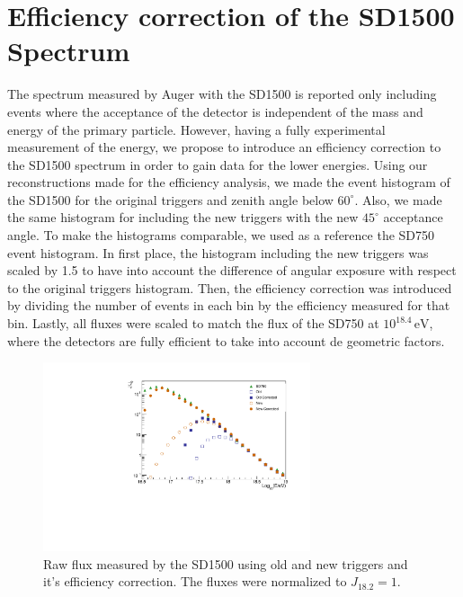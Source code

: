 \documentclass[12pt,a4paper]{article}
\newcommand{\eV}{\, \mathrm{eV}}
\begin{document}
\section{Efficiency correction of the SD1500 Spectrum}
\label{sec:spectrum}

The spectrum measured by Auger with the SD1500 is reported only including events where the acceptance of the detector is independent of the mass and energy of the primary particle. However, having a fully experimental measurement of the energy, we propose to introduce an efficiency correction to the SD1500 spectrum in order to gain data for the lower energies.
Using our reconstructions made for the efficiency analysis, we made the event histogram of the SD1500 for the original triggers and zenith angle below $60^{\circ}$. Also, we made the same histogram for including the new triggers with the new $45^{\circ}$ acceptance angle. To make the histograms comparable, we used as a reference the SD750 event histogram. In first place, the histogram including the new triggers was scaled by 1.5 to have into account the difference of angular exposure with respect to the original triggers histogram. Then, the efficiency correction was introduced by dividing the number of events in each bin by the efficiency measured for that bin. Lastly, all fluxes were scaled to match the flux of the SD750 at $10^{18.4}\eV$, where the detectors are fully efficient to take into account de geometric factors. 

\begin{figure}[h]
    \begin{center}
        \includegraphics[width=0.7\textwidth]{plots/spectrum.pdf}
        \caption{Raw flux measured by the SD1500 using old and new triggers and it's efficiency correction. The fluxes were normalized to $J_{18.2}=1$.
        \label{fig:flux}}
        \vspace{-0.5 cm}
    \end{center}
\end{figure}
\end{document}
